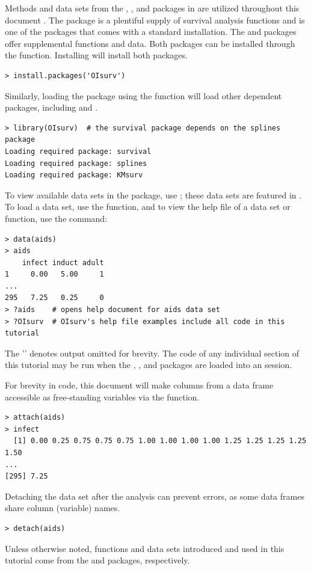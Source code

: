\documentclass[article]{jss}
\begin{document}
Methods and data sets from the , , and  packages in  are utilized throughout this document \citep{survival, OIsurv, KMsurv}. The  package is a plentiful supply of survival analysis functions and is one of the packages that comes with a standard  installation. The  and  packages offer supplemental functions and data. Both packages can be installed through the  function. Installing  will install both packages.
\begin{verbatim}
> install.packages('OIsurv')
\end{verbatim}
Similarly, loading the  package using the  function will load other dependent packages, including  and .
\begin{verbatim}
> library(OIsurv)  # the survival package depends on the splines package
Loading required package: survival
Loading required package: splines
Loading required package: KMsurv
\end{verbatim}
To view available data sets in the  package, use ; these data sets are featured in \citet{Klein2003}. To load a data set, use the  function, and to view the help file of a data set or function, use the  command:
\begin{verbatim}
> data(aids)
> aids
    infect induct adult
1     0.00   5.00     1
...
295   7.25   0.25     0
> ?aids    # opens help document for aids data set
> ?OIsurv  # OIsurv's help file examples include all code in this tutorial
\end{verbatim}
The '' denotes output omitted for brevity. The code of any individual section of this tutorial may be run when the , , and  packages are loaded into an  session.

For brevity in code, this document will make columns from a data frame accessible as free-standing variables via the  function.
\begin{verbatim}
> attach(aids)
> infect
  [1] 0.00 0.25 0.75 0.75 0.75 1.00 1.00 1.00 1.00 1.25 1.25 1.25 1.25 1.50
...
[295] 7.25
\end{verbatim}
Detaching the data set after the analysis can prevent errors, as some data frames share column (variable) names.
\begin{verbatim}
> detach(aids)
\end{verbatim}
Unless otherwise noted, functions and data sets introduced and used in this tutorial come from the  and  packages, respectively.
\end{document}
